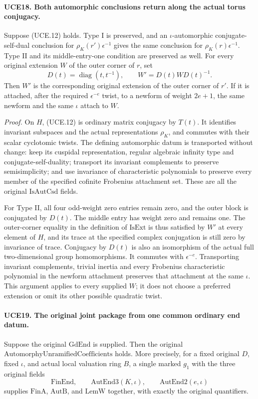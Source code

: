 \paragraph{UCE18. Both automorphic conclusions return along the actual torus conjugacy.}
\label{claim:UCE18}
Suppose (UCE.12) holds.  Type I is preserved, and an
\(\iota\)-automorphic conjugate-self-dual conclusion for
\(\rho_K(r')\epsilon^{-1}\) gives the same conclusion for
\(\rho_K(r)\epsilon^{-1}\).  Type II and its middle-entry-one
condition are preserved as well.  For every original extension
\(W\) of the outer corner of \(r\), set
\[
 D(t)=\operatorname{diag}(t,t^{-1}),\qquad
                         W'=D(t)WD(t)^{-1}.
 \tag{UCE.14}
\]
Then \(W'\) is the corresponding original extension of the
outer corner of \(r'\).  If it is attached, after the required
\(\epsilon^{-e}\) twist, to a newform of weight \(2e+1\),
the same newform and the same \(\iota\) attach to \(W\).

\emph{Proof.}
On \(H\), (UCE.12) is ordinary matrix conjugacy by \(T(t)\).
It identifies invariant subspaces and the actual representations
\(\rho_K\), and commutes with their scalar cyclotomic twists.
The defining automorphic datum is transported without change:
keep its cuspidal representation, regular algebraic infinity type
and conjugate-self-duality; transport its invariant complements
to preserve semisimplicity; and use invariance of characteristic
polynomials to preserve every member of the specified cofinite
Frobenius attachment set.  These are all the original
\(\mathrm{IsAutCsd}\) fields.

For Type II, all four odd-weight zero entries remain zero, and
the outer block is conjugated by \(D(t)\).  The middle entry
has weight zero and remains one.  The outer-corner equality in
the definition of \(\mathrm{IsExt}\) is thus satisfied by
\(W'\) at every element of \(H\), and its trace at the
specified complex conjugation is still zero by invariance of trace.
Conjugacy by \(D(t)\) is also an isomorphism of the actual full
two-dimensional group homomorphisms.  It commutes with
\(\epsilon^{-e}\).  Transporting invariant complements,
trivial inertia and every Frobenius characteristic polynomial
in the newform attachment preserves that attachment at the same
\(\iota\).  This argument applies to every supplied \(W\);
it does not choose a preferred extension or omit its other possible
quadratic twist.

\paragraph{UCE19. The original joint package from one common ordinary end datum.}
\label{claim:UCE19}
Suppose the original \(\mathrm{GdEnd}\) is supplied.  Then the
original \(\mathrm{AutomorphyUnramifiedCoefficients}\) holds.
More precisely, for a fixed original \(D\), fixed \(\iota\),
and actual local valuation ring \(B\), a single marked \(g_1\)
with the three original fields
\[
        \mathrm{FinEnd},\qquad
        \mathrm{AutEnd3}(K,\iota),\qquad
        \mathrm{AutEnd2}(e,\iota)
 \tag{UCE.15}
\]
supplies \(\mathrm{FinA}\), \(\mathrm{AutB}\), and
\(\mathrm{LemW}\) together, with exactly the original quantifiers.


